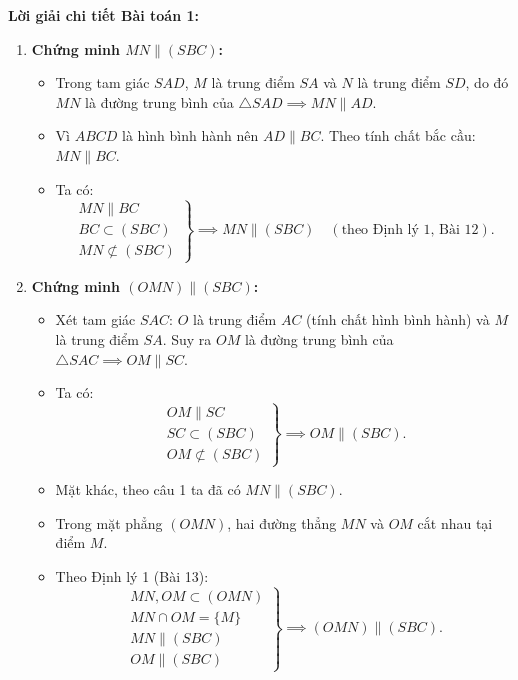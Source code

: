 \documentclass[12pt, a4paper]{article}
\begin{document}
\textbf{Lời giải chi tiết Bài toán 1:}
\begin{enumerate}[leftmargin=0.6cm]
    \item \textbf{Chứng minh $MN \parallel (SBC)$:}
    \begin{itemize}
        \item Trong tam giác $SAD$, $M$ là trung điểm $SA$ và $N$ là trung điểm $SD$, do đó $MN$ là đường trung bình của $\triangle SAD \implies MN \parallel AD$.
        \item Vì $ABCD$ là hình bình hành nên $AD \parallel BC$. Theo tính chất bắc cầu: $MN \parallel BC$.
        \item Ta có:
        $$\left.\begin{array}{l} MN \parallel BC \\ BC \subset (SBC) \\ MN \not\subset (SBC) \end{array}\right\} \implies MN \parallel (SBC) \quad (\text{theo Định lý 1, Bài 12}).$$
    \end{itemize}

    \item \textbf{Chứng minh $(OMN) \parallel (SBC)$:}
    \begin{itemize}
        \item Xét tam giác $SAC$: $O$ là trung điểm $AC$ (tính chất hình bình hành) và $M$ là trung điểm $SA$.
        Suy ra $OM$ là đường trung bình của $\triangle SAC \implies OM \parallel SC$.
        \item Ta có:
        $$\left.\begin{array}{l} OM \parallel SC \\ SC \subset (SBC) \\ OM \not\subset (SBC) \end{array}\right\} \implies OM \parallel (SBC).$$
        \item Mặt khác, theo câu 1 ta đã có $MN \parallel (SBC)$.
        \item Trong mặt phẳng $(OMN)$, hai đường thẳng $MN$ và $OM$ cắt nhau tại điểm $M$.
        \item Theo Định lý 1 (Bài 13):
        $$\left.\begin{array}{l} MN, OM \subset (OMN) \\ MN \cap OM = \{M\} \\ MN \parallel (SBC) \\ OM \parallel (SBC) \end{array}\right\} \implies (OMN) \parallel (SBC).$$
    \end{itemize}
\end{enumerate}
\end{document}
